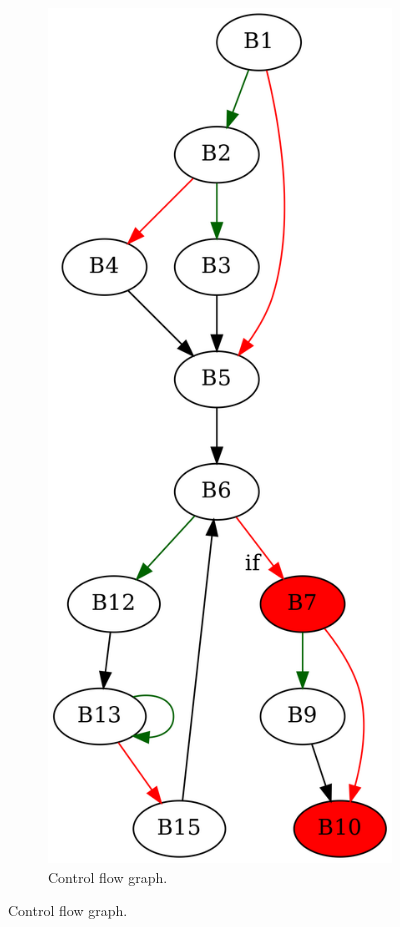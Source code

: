 \documentclass[aspectratio=1610]{beamer}
\begin{document}
\begin{frame}[noframenumbering]
\begin{figure}[htbp]
\begin{subfigure}[b]{0.50\textwidth}
			\includegraphics[height=0.6\paperheight]{inc/methods/interval/example/sample/f_0004a.png}
			\caption{Control flow graph.}
		\end{subfigure}
	\end{figure}
\end{frame}
\end{document}
